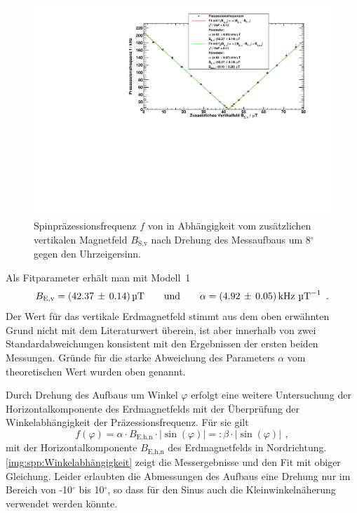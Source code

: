 \begin{figure}[H]
    \begin{center}
        \includegraphics[width=\textwidth]{../img/part4/Rb85_gedreht.pdf}
        \caption{Spinpräzessionsfrequenz $f$ von  in Abhängigkeit
        vom zusätzlichen vertikalen Magnetfeld $B_\text{S,v}$
        nach Drehung des Messaufbaus um 8$^\circ$ gegen den Uhrzeigersinn.}
        \label{img:spp:SPPRb87gedr}
    \end{center}
\end{figure}

Als Fitparameter erhält man mit Modell~1
\begin{equation}
    B_\text{E,v} = (42.37\,\pm\,0.14)\,\text{\textmu T} \qquad \text{und} \qquad \alpha = (4.92\,\pm\,0.05)\,\text{kHz } \text{\textmu T}^{-1} \ \, .
\end{equation}
Der Wert für das vertikale Erdmagnetfeld stimmt aus dem oben erwähnten Grund nicht mit dem Literaturwert überein,
ist aber innerhalb von zwei Standardabweichungen konsistent mit den Ergebnissen der ersten beiden Messungen.
Gründe für die starke Abweichung des Parameters $\alpha$ vom theoretischen Wert wurden oben genannt.

Durch Drehung des Aufbaus um Winkel $\varphi$ erfolgt eine weitere Untersuchung der Horizontalkomponente des Erdmagnetfelds 
mit der Überprüfung der Winkelabhängigkeit der Präzessionsfrequenz.
Für sie gilt
\begin{equation}
    f(\varphi) = \alpha \cdot B_\text{E,h,n} \cdot |\sin(\varphi)| =:\beta \cdot |\sin(\varphi)|\ \, ,
\end{equation}
mit der Horizontalkomponente $B_\text{E,h,n}$ des Erdmagnetfelds in Nordrichtung.
\autoref{img:spp:Winkelabhängigkeit} zeigt die Messergebnisse und den Fit mit obiger Gleichung.
Leider erlaubten die Abmessungen des Aufbaus eine Drehung nur im Bereich von -10$^\circ$ bis 10$^\circ$,
so dass für den Sinus auch die Kleinwinkelnäherung verwendet werden könnte.


